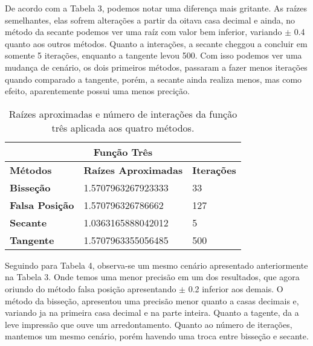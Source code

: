 \documentclass[12pt]{article}
\begin{document}
De acordo com a Tabela 3, podemos notar uma diferença mais gritante. As raízes semelhantes, elas sofrem alterações a partir da oitava casa decimal e ainda, no método da secante podemos ver uma raíz com valor bem inferior, variando $\pm$ 0.4 quanto aos outros métodos. Quanto a interações, a secante cheggou a concluir em somente 5 iterações, enquanto a tangente levou 500. Com isso podemos ver uma mudança de cenário, os dois primeiros métodos, passaram a fazer menos iterações quando comparado a tangente, porém, a secante ainda realiza menos, mas como efeito, aparentemente possui uma menos precição.
\begin{table}[!h]
\begin{center}
\begin{tabular}{lll}
\multicolumn{3}{c}{\textbf{Função Três}}                                                                            \\ \hline
\multicolumn{1}{l|}{\textbf{Métodos}}       & \multicolumn{1}{l|}{\textbf{Raízes Aproximadas}} & \textbf{Iterações} \\ \hline
\multicolumn{1}{l|}{\textbf{Bisseção}}      & \multicolumn{1}{l|}{1.5707963267923333}          & 33                 \\ \hline
\multicolumn{1}{l|}{\textbf{Falsa Posição}} & \multicolumn{1}{l|}{1.570796326786662}           & 127                \\ \hline
\multicolumn{1}{l|}{\textbf{Secante}}       & \multicolumn{1}{l|}{1.0363165888042012}          & 5                  \\ \hline
\multicolumn{1}{l|}{\textbf{Tangente}}      & \multicolumn{1}{l|}{1.5707963355056485}         & 500               
\end{tabular}
    \caption{Raízes aproximadas e número de interações da função três aplicada aos quatro métodos.}
\end{center}
\end{table}

Seguindo para Tabela 4, observa-se um mesmo cenário apresentado anteriormente na Tabela 3. Onde temos uma menor precisão em um dos resultados, que agora oriundo do método falsa posição apresentando $\pm$ 0.2 inferior aos demais. O método da bisseção, apresentou uma precisão menor quanto a casas decimais e, variando ja na primeira casa decimal e na parte inteira. Quanto a tagente, da a leve impressão que ouve um arredontamento. Quanto ao número de iterações, mantemos um mesmo cenário, porém havendo uma troca entre bisseção e secante.
\end{document}
